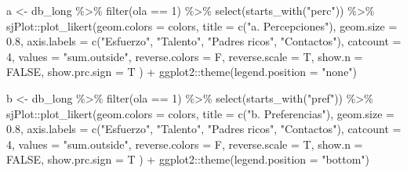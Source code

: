 \documentclass[
  12pt,
]{article}
\newenvironment{Shaded}{\begin{snugshade}}{\end{snugshade}}
\newcommand{\AttributeTok}[1]{\textcolor[rgb]{0.40,0.45,0.13}{#1}}
\newcommand{\ConstantTok}[1]{\textcolor[rgb]{0.56,0.35,0.01}{#1}}
\newcommand{\DecValTok}[1]{\textcolor[rgb]{0.68,0.00,0.00}{#1}}
\newcommand{\FloatTok}[1]{\textcolor[rgb]{0.68,0.00,0.00}{#1}}
\newcommand{\FunctionTok}[1]{\textcolor[rgb]{0.28,0.35,0.67}{#1}}
\newcommand{\NormalTok}[1]{\textcolor[rgb]{0.00,0.23,0.31}{#1}}
\newcommand{\OtherTok}[1]{\textcolor[rgb]{0.00,0.23,0.31}{#1}}
\newcommand{\SpecialCharTok}[1]{\textcolor[rgb]{0.37,0.37,0.37}{#1}}
\newcommand{\StringTok}[1]{\textcolor[rgb]{0.13,0.47,0.30}{#1}}
\begin{document}
\begin{Shaded}
\begin{Highlighting}[]
\NormalTok{a }\OtherTok{\textless{}{-}}\NormalTok{ db\_long }\SpecialCharTok{\%\textgreater{}\%} 
  \FunctionTok{filter}\NormalTok{(ola }\SpecialCharTok{==} \DecValTok{1}\NormalTok{) }\SpecialCharTok{\%\textgreater{}\%}
  \FunctionTok{select}\NormalTok{(}\FunctionTok{starts\_with}\NormalTok{(}\StringTok{"perc"}\NormalTok{)) }\SpecialCharTok{\%\textgreater{}\%} 
\NormalTok{  sjPlot}\SpecialCharTok{::}\FunctionTok{plot\_likert}\NormalTok{(}\AttributeTok{geom.colors =}\NormalTok{ colors,}
                      \AttributeTok{title =} \FunctionTok{c}\NormalTok{(}\StringTok{"a. Percepciones"}\NormalTok{),}
                      \AttributeTok{geom.size =} \FloatTok{0.8}\NormalTok{,}
                      \AttributeTok{axis.labels =} \FunctionTok{c}\NormalTok{(}\StringTok{"Esfuerzo"}\NormalTok{, }\StringTok{"Talento"}\NormalTok{, }\StringTok{"Padres ricos"}\NormalTok{, }\StringTok{"Contactos"}\NormalTok{),}
                      \AttributeTok{catcount =} \DecValTok{4}\NormalTok{,}
                      \AttributeTok{values  =}  \StringTok{"sum.outside"}\NormalTok{,}
                      \AttributeTok{reverse.colors =}\NormalTok{ F,}
                      \AttributeTok{reverse.scale =}\NormalTok{ T,}
                      \AttributeTok{show.n =} \ConstantTok{FALSE}\NormalTok{,}
                      \AttributeTok{show.prc.sign =}\NormalTok{ T}
\NormalTok{                      ) }\SpecialCharTok{+}
\NormalTok{  ggplot2}\SpecialCharTok{::}\FunctionTok{theme}\NormalTok{(}\AttributeTok{legend.position =} \StringTok{"none"}\NormalTok{)}

\NormalTok{b }\OtherTok{\textless{}{-}}\NormalTok{ db\_long }\SpecialCharTok{\%\textgreater{}\%} 
  \FunctionTok{filter}\NormalTok{(ola }\SpecialCharTok{==} \DecValTok{1}\NormalTok{) }\SpecialCharTok{\%\textgreater{}\%} 
  \FunctionTok{select}\NormalTok{(}\FunctionTok{starts\_with}\NormalTok{(}\StringTok{"pref"}\NormalTok{)) }\SpecialCharTok{\%\textgreater{}\%} 
\NormalTok{  sjPlot}\SpecialCharTok{::}\FunctionTok{plot\_likert}\NormalTok{(}\AttributeTok{geom.colors =}\NormalTok{ colors,}
                      \AttributeTok{title =} \FunctionTok{c}\NormalTok{(}\StringTok{"b. Preferencias"}\NormalTok{),}
                      \AttributeTok{geom.size =} \FloatTok{0.8}\NormalTok{,}
                     \AttributeTok{axis.labels =} \FunctionTok{c}\NormalTok{(}\StringTok{"Esfuerzo"}\NormalTok{, }\StringTok{"Talento"}\NormalTok{, }\StringTok{"Padres ricos"}\NormalTok{, }\StringTok{"Contactos"}\NormalTok{),}
                      \AttributeTok{catcount =} \DecValTok{4}\NormalTok{,}
                      \AttributeTok{values  =}  \StringTok{"sum.outside"}\NormalTok{,}
                      \AttributeTok{reverse.colors =}\NormalTok{ F,}
                      \AttributeTok{reverse.scale =}\NormalTok{ T,}
                      \AttributeTok{show.n =} \ConstantTok{FALSE}\NormalTok{,}
                      \AttributeTok{show.prc.sign =}\NormalTok{ T}
\NormalTok{  ) }\SpecialCharTok{+}
\NormalTok{  ggplot2}\SpecialCharTok{::}\FunctionTok{theme}\NormalTok{(}\AttributeTok{legend.position =} \StringTok{"bottom"}\NormalTok{)}


\end{Highlighting}
\end{Shaded}
\end{document}
